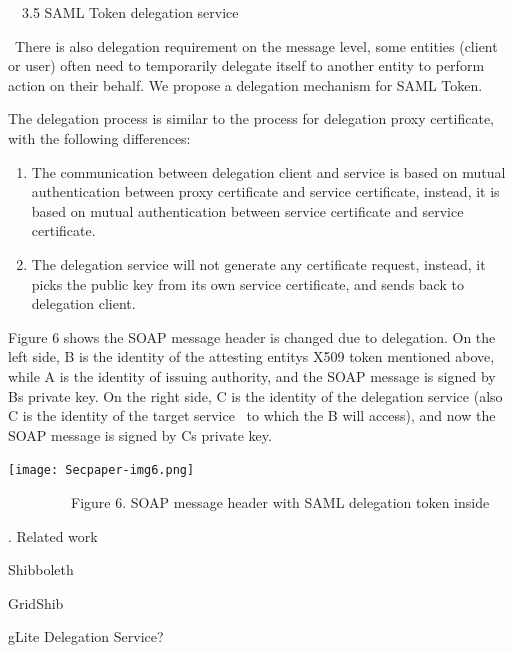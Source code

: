 \documentclass{article}
\newcommand\liststyleLv{%
\renewcommand\theenumi{\arabic{enumi}}
\renewcommand\theenumii{\arabic{enumii}}
\renewcommand\theenumiii{\arabic{enumiii}}
\renewcommand\theenumiv{\arabic{enumiv}}
\renewcommand\labelenumi{\theenumi.}
\renewcommand\labelenumii{\theenumii.}
\renewcommand\labelenumiii{\theenumiii.}
\renewcommand\labelenumiv{\theenumiv.}
}
\begin{document}
\bigskip

\ \ 3.5 SAML Token delegation service

\ There is also delegation requirement on the message level, some
entities (client or user) often need to temporarily delegate itself to
another entity to perform action on their behalf. We propose a
delegation mechanism for SAML Token. 

The delegation process is similar to the process for delegation proxy
certificate, with the following differences:

\liststyleLv
\begin{enumerate}
\item The communication between delegation client and service is based
on mutual authentication between proxy certificate and service
certificate, instead, it is based on mutual authentication between
service certificate and service certificate.
\item The delegation service will not generate any certificate request,
instead, it picks the public key from its own service certificate, and
sends back to delegation client.
\end{enumerate}
Figure 6 shows the SOAP message header is changed due to delegation. On
the left side, B is the identity of the attesting
entity{\textquotesingle}s X509 token mentioned above, while A is the
identity of issuing authority, and the SOAP message is signed by
B{\textquotesingle}s private key. On the right side, C is the identity
of the delegation service (also C is the identity of the target service
\ to which the B will access), and now the SOAP message is signed by
C{\textquotesingle}s private key.


\bigskip



\begin{center}
\texttt{[image: Secpaper-img6.png]}
\end{center}
{\centering
\ \ \ \ \ \ \ \ \ Figure 6. SOAP message header with SAML delegation
token inside
\par}


\bigskip


\bigskip


\bigskip


\bigskip

{. Related work
\par}

Shibboleth

GridShib

gLite Delegation Service?
\end{document}
